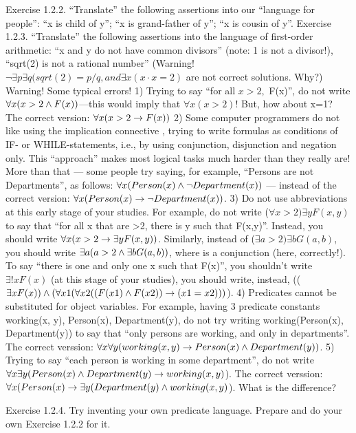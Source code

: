 Exercise 1.2.2. ``Translate'' the following assertions into our ``language for people'':
``x is child of y'';
``x is grand-father of y'';
``x is cousin of y''.
Exercise 1.2.3. ``Translate'' the following assertions into the language of first-order arithmetic:
``x and y do not have common divisors'' (note: 1 is not a divisor!),
``sqrt(2) is not a rational number''
(Warning! \(\neg \exists p\exists q(sqrt(2)=p/q, and \exists x(x\cdot x=2)\) are not correct solutions. Why?)
Warning! Some typical errors!
1) Trying to say ``for all \(x>2,\) F(x)'', do not write \(\forall x(x>2\wedge F(x))\)---this would imply that \(\forall x(x>2)\)! But,
how about x=1? The correct version: \(\forall x(x>2\rightarrow F(x))\)
2) Some computer programmers do not like using the implication connective \IMPLIES , trying to write formulas
as conditions of IF- or WHILE-statements, i.e., by using conjunction, disjunction and negation only. This
``approach'' makes most logical tasks much harder than they really are! More than that --- some people try
saying, for example, ``Persons are not Departments'', as follows:
\(\forall x(Person(x)\wedge \neg Department(x))\) --- instead of the correct version: \(\forall x(Person(x)\rightarrow \neg Department(x))\).
3) Do not use abbreviations at this early stage of your studies. For example, do not write (\(\forall x>2)\exists yF(x,y)\)
to say that ``for all x that are >2, there is y such that F(x,y)''. Instead, you should write
\(\forall x(x>2\rightarrow \exists yF(x,y))\). Similarly, instead of (\(\exists a>2)\exists bG(a,b)\), you should write \(\exists a(a>2\wedge \exists bG(a,b))\), where
\AND  is a conjunction (here, correctly!).
To say ``there is one and only one x such that F(x)'', you shouldn't write \(\exists !x F(x)\) (at this stage of your
studies), you should write, instead, ((\(\exists xF(x))\wedge (\forall x1(\forall x2((F(x1)\wedge F(x2))\rightarrow (x1=x2)))\)).
4) Predicates cannot be substituted for object variables. For example, having 3 predicate constants
working(x, y), Person(x), Department(y), do not try writing working(Person(x), Department(y)) to say
that ``only persons are working, and only in departments''. The correct verssion: \(\forall x\forall y(working(x, y)\rightarrow Person(x)\wedge Department(y))\).
5) Trying to say ``each person is working in some department'', do not write
\(\forall x\exists y(Person(x)\wedge Department(y)\rightarrow working(x,y)\)). The correct verssion:
\(\forall x(Person(x)\rightarrow \exists y(Department(y)\wedge working(x,y)\)). What is the difference?

Exercise 1.2.4. Try inventing your own predicate language. Prepare and do your own Exercise 1.2.2 for it.

